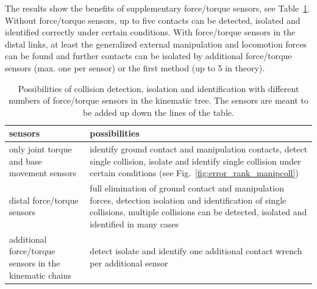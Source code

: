 The results show the benefits of supplementary force/torque sensors, see Table~\ref{tab:sensor_benefits}.
Without force/torque sensors, up to five contacts can be detected, isolated and identified correctly under certain conditions.
With force/torque sensors in the distal links, at least the generalized external manipulation and locomotion forces can be found and further contacts can be isolated by additional force/torque sensors (max. one per sensor) or the first method (up to 5 in theory).
%
\begin{table}
\caption{Possibilities of collision detection, isolation and identification with different numbers of force/torque sensors in the kinematic tree. The sensors are meant to be added up down the lines of the table.}\label{tab:sensor_benefits}
\begin{tabular}{|p{2.8cm}|p{5cm}|}
\hline
sensors & possibilities\\\hline
only joint torque and base movement sensors & identify ground contact and manipulation contacts, detect single collision, isolate and identify single collision under certain conditions (see Fig.~\ref{fig:error_rank_manipcoll})\\\hline
distal force/torque sensors & full elimination of ground contact and manipulation forces, detection isolation and identification of single collisions, multiple collisions can be detected, isolated and identified in many cases\\\hline
additional force/torque sensors in the kinematic chains & detect isolate and identify one additional contact wrench per additional sensor\\\hline
\end{tabular}\vspace*{-0.3cm}
\end{table}

